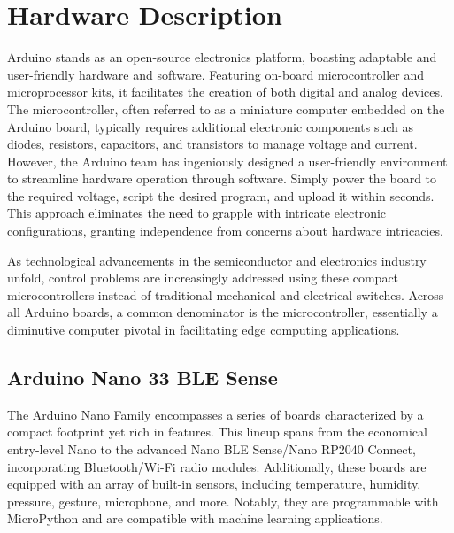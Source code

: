 %
%

\chapter{Hardware Description}

Arduino stands as an open-source electronics platform, boasting adaptable and user-friendly hardware and software. Featuring on-board microcontroller and microprocessor kits, it facilitates the creation of both digital and analog devices. The microcontroller, often referred to as a miniature computer embedded on the Arduino board, typically requires additional electronic components such as diodes, resistors, capacitors, and transistors to manage voltage and current. However, the Arduino team has ingeniously designed a user-friendly environment to streamline hardware operation through software. Simply power the board to the required voltage, script the desired program, and upload it within seconds. This approach eliminates the need to grapple with intricate electronic configurations, granting independence from concerns about hardware intricacies.

As technological advancements in the semiconductor and electronics industry unfold, control problems are increasingly addressed using these compact microcontrollers instead of traditional mechanical and electrical switches. Across all Arduino boards, a common denominator is the microcontroller, essentially a diminutive computer pivotal in facilitating edge computing applications.\cite{Arduino:2023}

\section{Arduino Nano 33 BLE Sense}

The Arduino Nano Family encompasses a series of boards characterized by a compact footprint yet rich in features. This lineup spans from the economical entry-level Nano to the advanced Nano BLE Sense/Nano RP2040 Connect, incorporating Bluetooth/Wi-Fi radio modules. Additionally, these boards are equipped with an array of built-in sensors, including temperature, humidity, pressure, gesture, microphone, and more. Notably, they are programmable with MicroPython and are compatible with machine learning applications.\cite{Raj:2019}

